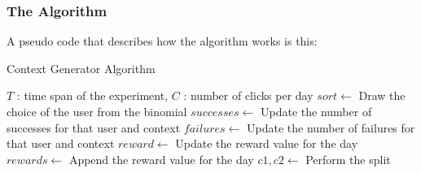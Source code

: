 \subsubsection{The Algorithm}
A pseudo code that describes how the algorithm works is this:\\

\begin{algorithm}
	\caption{Context Generator Algorithm}
	\begin{algorithmic}[1]
		\renewcommand{\algorithmicrequire}{\textbf{Input:}}
		\REQUIRE $T$ : time span of the experiment, $C$ : number of clicks per day
		\STATE $sort \gets ${ Draw the choice of the user from the binomial}
		\STATE $successes \gets ${ Update the number of successes for that user and context}
		\STATE $failures \gets ${ Update the number of failures for that user and context}
		\ENDFOR
		\STATE $reward \gets ${ Update the reward value for the day}
		\ENDFOR
		\STATE $rewards \gets ${ Append the reward value for the day}
		\ENDFOR
		\STATE $c1, c2 \gets${ Perform the split}
		\ENDIF
		\ENDFOR
		\ENDFOR	
		\ENDIF
		\ENDFOR
	\end{algorithmic}
\end{algorithm}
\newpage
